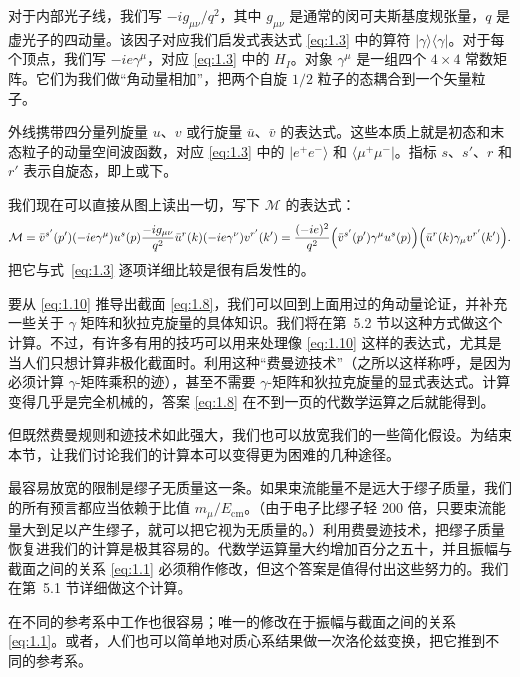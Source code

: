 对于内部光子线，我们写 $-ig_{\mu\nu}/q^{2}$，其中 $g_{\mu\nu}$ 是通常的闵可夫斯基度规张量，$q$ 是虚光子的四动量。该因子对应我们启发式表达式 \eqref{eq:1.3} 中的算符 $|\gamma\rangle\langle\gamma|$。对于每个顶点，我们写 $-ie\gamma^{\mu}$，对应 \eqref{eq:1.3} 中的 $H_I$。对象 $\gamma^{\mu}$ 是一组四个 $4\times4$ 常数矩阵。它们为我们做``角动量相加''，把两个自旋 $1/2$ 粒子的态耦合到一个矢量粒子。

外线携带四分量列旋量 $u$、$v$ 或行旋量 $\bar{u}$、$\bar{v}$ 的表达式。这些本质上就是初态和末态粒子的动量空间波函数，对应 \eqref{eq:1.3} 中的 $|e^{+}e^{-}\rangle$ 和 $\langle\mu^{+}\mu^{-}|$。指标 $s$、$s'$、$r$ 和 $r'$ 表示自旋态，即上或下。

我们现在可以直接从图上读出一切，写下 $\mathcal{M}$ 的表达式：
\begin{equation}
  \mathcal{M} =
    \bar{v}^{s'}(p')(-ie\gamma^{\mu})u^{s}(p)
    \frac{-ig_{\mu\nu}}{q^{2}}
    \bar{u}^{r}(k)(-ie\gamma^{\nu})v^{r'}(k')
    = \frac{(-ie)^{2}}{q^{2}}
      \Bigl(\bar{v}^{s'}(p')\gamma^{\mu}u^{s}(p)\Bigr)
      \Bigl(\bar{u}^{r}(k)\gamma_{\mu}v^{r'}(k')\Bigr).
  \label{eq:1.10}
\end{equation}
把它与式~\eqref{eq:1.3} 逐项详细比较是很有启发性的。

要从 \eqref{eq:1.10} 推导出截面 \eqref{eq:1.8}，我们可以回到上面用过的角动量论证，并补充一些关于 $\gamma$ 矩阵和狄拉克旋量的具体知识。我们将在第~5.2 节以这种方式做这个计算。不过，有许多有用的技巧可以用来处理像 \eqref{eq:1.10} 这样的表达式，尤其是当人们只想计算非极化截面时。利用这种``费曼迹技术''（之所以这样称呼，是因为必须计算 $\gamma$-矩阵乘积的迹），甚至不需要 $\gamma$-矩阵和狄拉克旋量的显式表达式。计算变得几乎是完全机械的，答案 \eqref{eq:1.8} 在不到一页的代数学运算之后就能得到。

但既然费曼规则和迹技术如此强大，我们也可以放宽我们的一些简化假设。为结束本节，让我们讨论我们的计算本可以变得更为困难的几种途径。

最容易放宽的限制是缪子无质量这一条。如果束流能量不是远大于缪子质量，我们的所有预言都应当依赖于比值 $m_\mu/E_{\mathrm{cm}}$。（由于电子比缪子轻 200 倍，只要束流能量大到足以产生缪子，就可以把它视为无质量的。）利用费曼迹技术，把缪子质量恢复进我们的计算是极其容易的。代数学运算量大约增加百分之五十，并且振幅与截面之间的关系 \eqref{eq:1.1} 必须稍作修改，但这个答案是值得付出这些努力的。我们在第~5.1 节详细做这个计算。

在不同的参考系中工作也很容易；唯一的修改在于振幅与截面之间的关系 \eqref{eq:1.1}。或者，人们也可以简单地对质心系结果做一次洛伦兹变换，把它推到不同的参考系。

